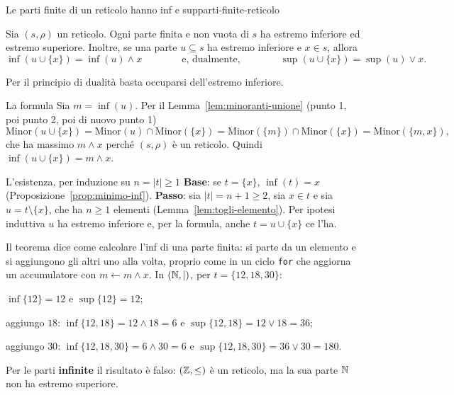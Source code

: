 \begin{concetto}
\begin{Teorema}{Le parti finite di un reticolo hanno inf e sup}{parti-finite-reticolo}
    \begin{prerequisiti}
    \end{prerequisiti}
    Sia $(s, \rho)$ un reticolo. Ogni parte finita e non vuota di $s$ ha estremo inferiore ed estremo superiore. Inoltre, se una parte $u \subseteq s$
    ha estremo inferiore e $x \in s$, allora
    \[ \inf(u \cup \{x\}) = \inf(u) \wedge x \qquad\qquad\text{e, dualmente,}\qquad\qquad \sup(u \cup \{x\}) = \sup(u) \vee x. \]
\end{Teorema}
\begin{dimostrazione}
    Per il principio di dualità basta occuparsi dell'estremo inferiore.
    \begin{caso}{La formula}
        Sia $m = \inf(u)$. Per il Lemma~\ref{lem:minoranti-unione} (punto 1, poi punto 2, poi di nuovo punto 1)
        \[ \mathrm{Minor}(u \cup \{x\}) = \mathrm{Minor}(u) \cap \mathrm{Minor}(\{x\}) = \mathrm{Minor}(\{m\}) \cap \mathrm{Minor}(\{x\}) = \mathrm{Minor}(\{m, x\}), \]
        che ha massimo $m \wedge x$ perché $(s, \rho)$ è un reticolo. Quindi $\inf(u \cup \{x\}) = m \wedge x$.
    \end{caso}
    \begin{caso}{L'esistenza, per induzione su $n = |t| \geq 1$}
        \textbf{Base}: se $t = \{x\}$, $\inf(t) = x$ (Proposizione~\ref{prop:minimo-inf}). \textbf{Passo}: sia $|t| = n + 1 \geq 2$, sia $x \in t$ e sia $u = t \setminus \{x\}$,
        che ha $n \geq 1$ elementi (Lemma~\ref{lem:togli-elemento}). Per ipotesi induttiva $u$ ha estremo inferiore e, per la formula, anche $t = u \cup \{x\}$ ce l'ha.
    \end{caso}
\end{dimostrazione}
\end{concetto}

\begin{spiegazione}
    Il teorema dice come calcolare l'inf di una parte finita: si parte da un elemento e si aggiungono gli altri uno alla volta, proprio
    come in un ciclo \texttt{for} che aggiorna un accumulatore con $m \gets m \wedge x$. In $(\mathbb{N}, \mid)$, per $t = \{12, 18, 30\}$:
    \begin{passi}
        \item $\inf\{12\} = 12$ e $\sup\{12\} = 12$;
        \item aggiungo $18$: $\inf\{12, 18\} = 12 \wedge 18 = 6$ e $\sup\{12, 18\} = 12 \vee 18 = 36$;
        \item aggiungo $30$: $\inf\{12, 18, 30\} = 6 \wedge 30 = 6$ e $\sup\{12, 18, 30\} = 36 \vee 30 = 180$.
    \end{passi}
    Per le parti \textbf{infinite} il risultato è falso: $(\mathbb{Z}, \leq)$ è un reticolo, ma la sua parte $\mathbb{N}$ non ha estremo superiore.
\end{spiegazione}

